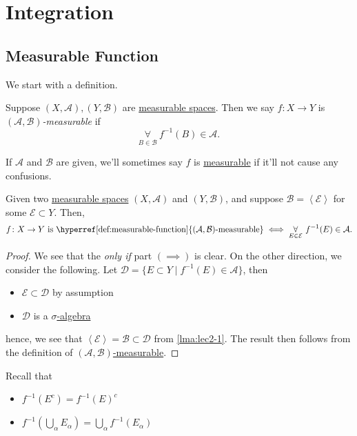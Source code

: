 \chapter{Integration}\label{ch:Integration}
\section{Measurable Function}
We start with a definition.

\begin{definition}\label{def:measurable-function}
	Suppose \((X, \mathcal{A} ), (Y, \mathcal{B} )\) are \hyperref[def:measurable-space]{measurable spaces}. Then we say \(f\colon X\to Y\) is
	\emph{\((\mathcal{A} , \mathcal{B} )\)-measurable} if
	\[
		\underset{B\in \mathcal{B}}{\forall}\ f^{-1} (B)\in \mathcal{A}.
	\]
\end{definition}

\begin{remark}
	If \(\mathcal{A} \) and \(\mathcal{B} \) are given, we'll sometimes say \(f\) is \hyperref[def:measurable-function]{measurable}
	if it'll not cause any confusions.
\end{remark}

\begin{lemma}\label{lma:lec10-1}
	Given two \hyperref[def:measurable-space]{measurable spaces} \((X, \mathcal{A} )\) and \((Y, \mathcal{B} )\), and suppose
	\(\mathcal{B} = \left< \mathcal{E}  \right> \) for some \(\mathcal{E} \subset Y\). Then,
	\[
		f\colon X\to Y \text{ is \hyperref[def:measurable-function]{\((\mathcal{A} , \mathcal{B})\)-measurable}}\iff \underset{E\in\mathcal{E}}{\forall}\ f^{-1} (E)\in \mathcal{A}.
	\]
\end{lemma}
\begin{proof}
	We see that the \emph{only if} part \((\implies )\) is clear. On the other direction, we consider the following. Let
	\(\mathcal{D} = \{E\subset Y \mid f^{-1} (E)\in \mathcal{A} \}\), then
	\begin{itemize}
		\item \(\mathcal{E} \subset \mathcal{D} \) by assumption
		\item \(\mathcal{D} \) is a \hyperref[def:sigma-algebra]{\(\sigma\)-algebra} 
	\end{itemize}
	hence, we see that \(\left< \mathcal{E} \right> = \mathcal{B} \subset \mathcal{D} \) from \autoref{lma:lec2-1}. The result then
	follows from the definition of \hyperref[def:measurable-function]{\((\mathcal{A} , \mathcal{B} )\)-measurable}.
\end{proof}
\begin{note}
	Recall that
	\begin{itemize}
		\item \(f^{-1} (E^{c} ) = f^{-1} (E)^{c} \)
		\item \(f^{-1} \left(\bigcup\limits_{\alpha} E_{\alpha }\right) = \bigcup\limits_{\alpha} f^{-1} (E_{\alpha })\)
	\end{itemize}
\end{note}

